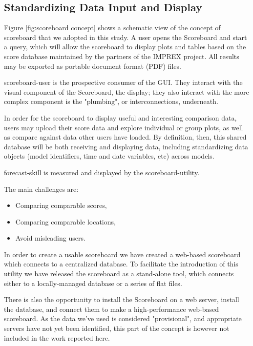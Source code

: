 \documentclass[logos,parttoc,morelanguage=french,morelanguage=german,draft]{orsay-memoire}
\begin{document}
\subsection{Standardizing Data Input and Display}

Figure \ref{fig:scoreboard concept} shows a schematic view of the concept of scoreboard that we adopted in this study. A user opens the Scoreboard and start a query, which will allow the scoreboard to display plots and tables based on the score database maintained by the partners of the IMPREX project. All results may be exported as portable document format (PDF) files.

\gls{scoreboard-user} is the prospective consumer of the GUI. They interact with the visual component of the Scoreboard, the display; they also interact with the more complex component is the "plumbing", or interconnections, underneath.

In order for the scoreboard to display useful and interesting comparison data, users may upload their score data and explore individual or group plots, as well as compare against data other users have loaded. By definition, then, this shared database will be both receiving and displaying data, including standardizing data objects (model identifiers, time and date variables, etc) across models.

\gls{forecast-skill} is measured and displayed by the \gls{scoreboard-utility}.

The main challenges are:
\begin{itemize}
	\item Comparing comparable scores,
	\item Comparing comparable locations,
	\item Avoid misleading users.
\end{itemize}

In order to create a usable scoreboard we have created a web-based scoreboard which connects to a centralized database. To facilitate the introduction of this utility we have released the scoreboard as a stand-alone tool, which connects either to a locally-managed database or a series of flat files.

There is also the opportunity to install the Scoreboard on a web server, install the database, and connect them to make a high-performance web-based scoreboard. As the data we've used is considered "provisional", and appropriate servers have not yet been identified, this part of the concept is however not included in the work reported here.
\end{document}
